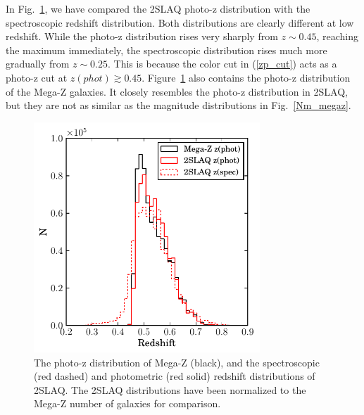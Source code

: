 In Fig.~\ref{Nz_megaz}, we have compared the 2SLAQ photo-z distribution with the spectroscopic redshift distribution. Both distributions are clearly different at low redshift. While the photo-z distribution rises very sharply from $z\sim0.45$, reaching the maximum immediately, the spectroscopic distribution rises much more gradually from $z\sim0.25$. This is because the color cut in (\ref{zp_cut}) acts as a photo-z cut at $z(phot)\gtrsim0.45$. Figure~\ref{Nz_megaz} also contains the photo-z distribution of the Mega-Z galaxies. It closely resembles the photo-z distribution in 2SLAQ, but they are not as similar as the magnitude distributions in Fig.~\ref{Nm_megaz}. 
\begin{figure}
\centering
\includegraphics[type=pdf,ext=.pdf,read=.pdf, width=85mm]{./plots/Nz_megaz}
\caption{The photo-z distribution of Mega-Z (black), and the spectroscopic (red dashed) and photometric (red solid) redshift distributions of 2SLAQ. The 2SLAQ distributions have been normalized to the Mega-Z number of galaxies for comparison.}
\label{Nz_megaz}
\end{figure}


